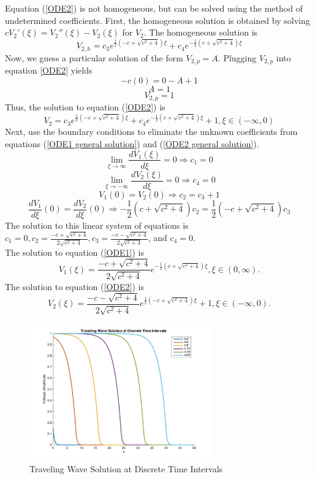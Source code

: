 \documentclass[12pt]{article}
\begin{document}
Equation (\ref{ODE2}) is not homogeneous, but can be solved using the method of undetermined coefficients. First, the homogeneous solution is obtained by solving $cV_2'(\xi)=V_2''(\xi)-V_2(\xi)$ for $V_2$. The homogeneous solution is
$$V_{2,h}=c_3 e^{\frac{1}{2}(-c+\sqrt{c^2+4})\xi}+c_4 e^{-\frac{1}{2}(c+\sqrt{c^2+4})\xi}$$
Now, we guess a particular solution of the form $V_{2,p}=A$. Plugging $V_{2,p}$ into equation \ref{ODE2} yields 
$$-c(0)=0-A+1$$
$$A=1$$ 
$$V_{2,p}=1$$
Thus, the solution to equation (\ref{ODE2}) is 
\begin{equation}
\label{ODE2 general solution}
V_{2}=c_3 e^{\frac{1}{2}(-c+\sqrt{c^2+4})\xi}+c_4 e^{-\frac{1}{2}(c+\sqrt{c^2+4})\xi}+1, \xi \in (-\infty,0)
\end{equation}
Next, use the boundary conditions to eliminate the unknown coefficients from equations (\ref{ODE1 general solution}) and (\ref{ODE2 general solution}). 
$$\lim_{\xi\to\infty} \frac{d V_1(\xi)}{d \xi}=0\Rightarrow c_1=0$$
$$\lim_{\xi\to-\infty} \frac{d V_2(\xi)}{d \xi}=0\Rightarrow c_4=0$$
$$V_1(0)=V_2(0)\Rightarrow c_2=c_3+1$$
$$\frac{d V_1}{d \xi}(0)=\frac{d V_2}{d \xi}(0)\Rightarrow -\frac{1}{2}(c+\sqrt{c^2+4}) c_2= \frac{1}{2}(-c+\sqrt{c^2+4})c_3$$ 
The solution to this linear system of equations is $c_1=0, c_2=\frac{-c+\sqrt{c^2+4}}{2\sqrt{c^2+4}}, c_3=\frac{-c-\sqrt{c^2+4}}{2\sqrt{c^2+4}}$, and $c_4=0$.\\
The solution to equation (\ref{ODE1}) is 
\begin{equation}
\label{ODE1 solution}
V_1(\xi)=\frac{-c+\sqrt{c^2+4}}{2\sqrt{c^2+4}}e^{-\frac{1}{2}(c+\sqrt{c^2+4})\xi},\xi \in (0,\infty).
\end{equation}
The solution to equation (\ref{ODE2}) is
\begin{equation}
\label{ODE2 solution}
V_2(\xi)=\frac{-c-\sqrt{c^2+4}}{2\sqrt{c^2+4}}e^{\frac{1}{2}(-c+\sqrt{c^2+4})\xi}+1,\xi \in (-\infty,0).
\end{equation}
\begin{figure}[H]
\centering
\includegraphics[width=0.7\textwidth]{waveThang.jpg}
\caption{Traveling Wave Solution at Discrete Time Intervals}
\label{kahkaw}
\end{figure}
\end{document}
